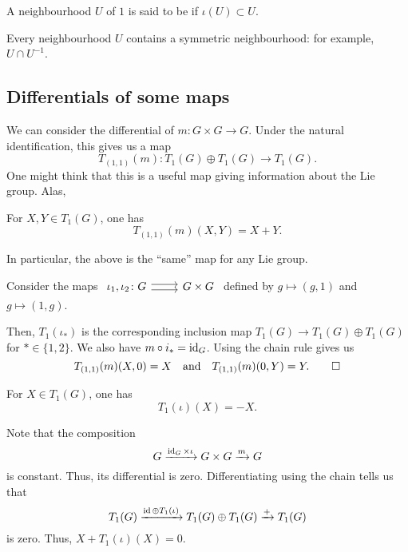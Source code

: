 \documentclass[12pt]{article}
\begin{document}
\begin{defn}
	A neighbourhood $U$ of $1$ is said to be  if $\iota(U) \subset U$.
\end{defn}
Every neighbourhood $U$ contains a symmetric neighbourhood: for example, $U \cap U^{-1}$.

\subsection{Differentials of some maps}

We can consider the differential of $m \colon G \times G \to G$. 
Under the natural identification, this gives us a map
\begin{equation*} 
	T_{(1, 1)}(m) \colon T_{1}(G) \oplus T_{1}(G) \to T_{1}(G).
\end{equation*}
One might think that this is a useful map giving information about the Lie group. Alas,
\begin{thm} \label{thm:differential-multiplication}
	For $X, Y \in T_{1}(G)$, one has
	\begin{equation*} 
		T_{(1, 1)}(m)(X, Y) = X + Y.
	\end{equation*}
\end{thm}
In particular, the above is the ``same'' map for any Lie group.
\begin{sketch}
	Consider the maps $\begin{tikzcd} \iota_{1}, \iota_{2} \colon G \arrow[r, shift left] \arrow[r, shift right] & G \times G \end{tikzcd}$ defined by $g \mapsto (g, 1)$ and $g \mapsto (1, g)$. 

	Then, $T_{1}(\iota_{\ast})$ is the corresponding inclusion map $T_{1}(G) \to T_{1}(G) \oplus T_{1}(G)$ for $\ast \in \{1, 2\}$. 
	We also have $m \circ i_{\ast} = \operatorname{id}_{G}$. \newline
	Using the chain rule gives us
	\begin{equation*} 
		T_{(1, 1)}(m)(X, 0) = X \quad\text{and}\quad T_{(1, 1)}(m)(0, Y) = Y. \qedhere
	\end{equation*}
\end{sketch}

\begin{thm} \label{thm:differential-inversion}
	For $X \in T_{1}(G)$, one has
	\begin{equation*} 
		T_{1}(\iota)(X) = -X.
	\end{equation*}
\end{thm}
\begin{sketch}
	Note that the composition
	\begin{equation*} 
		G \xrightarrow{\operatorname{id}_{G} \times \iota} G \times G \xrightarrow{m} G
	\end{equation*}
	is constant. Thus, its differential is zero. 
	Differentiating using the chain tells us that
	\begin{equation*} 
		T_{1}(G) \xrightarrow{\operatorname{id} \oplus T_{1}(\iota)} T_{1}(G) \oplus T_{1}(G) \xrightarrow{+} T_{1}(G)
	\end{equation*}
	is zero. Thus, $X + T_{1}(\iota)(X) = 0$.
\end{sketch}
\end{document}
